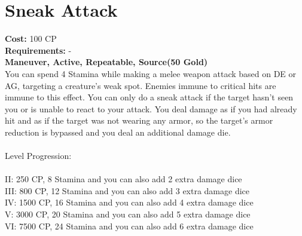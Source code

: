 \section{Sneak Attack}
\textbf{Cost:} 100 CP\\
\textbf{Requirements:} -\\
\textbf{Maneuver, Active, Repeatable, Source(50 Gold)}\\
You can spend 4 Stamina while making a melee weapon attack based on DE or AG, targeting a creature’s weak spot. Enemies immune to critical hits are immune to this effect. You can only do a sneak attack if the target hasn’t seen you or is unable to react to your attack. You deal damage as if you had already hit and as if the target was not wearing any armor, so the target’s armor reduction is bypassed and you deal an additional damage die.\\
\\
Level Progression:\\
\\
II: 250 CP, 8 Stamina and you can also add 2 extra damage dice\\
III: 800 CP, 12 Stamina and you can also add 3 extra damage dice\\
IV: 1500 CP, 16 Stamina and you can also add 4 extra damage dice\\
V: 3000 CP, 20 Stamina and you can also add 5 extra damage dice\\
VI: 7500 CP, 24 Stamina and you can also add 6 extra damage dice\\